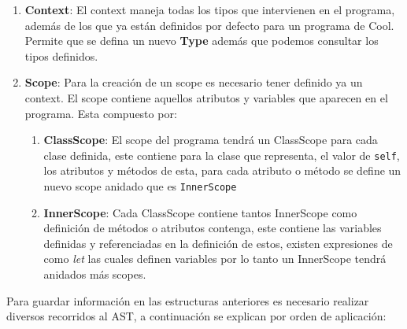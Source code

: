 \documentclass{article}
\begin{document}
\begin{enumerate}
	\item [] \textbf{Context}: El context maneja todas los tipos que intervienen en el programa, adem\'as de los que ya est\'an definidos por defecto para un programa de Cool. Permite que se defina un nuevo \textbf{Type} adem\'as que podemos consultar los tipos definidos.
	
	\item[] \textbf{Scope}: Para la creaci\'on de un scope es necesario tener definido ya un context. El scope contiene aquellos atributos y variables que aparecen en el programa. Esta compuesto por:
		\begin{enumerate}
			\item[] \textbf{ClassScope}: El scope del programa tendr\'a un ClassScope para cada clase definida, este contiene para la clase que representa, el valor de \verb|self|, los atributos y m\'etodos de esta, para cada atributo o m\'etodo se define un nuevo scope anidado que es \verb|InnerScope|\\
		
			\item[] \textbf{InnerScope}: Cada ClassScope contiene tantos InnerScope como definici\'on de m\'etodos o atributos contenga, este contiene las variables definidas y referenciadas en la definici\'on de estos, existen expresiones de como \textit{let} las cuales definen variables por lo tanto un InnerScope tendr\'a anidados m\'as scopes. 
		\end{enumerate}
\end{enumerate}

Para guardar informaci\'on en las estructuras anteriores es necesario realizar diversos recorridos al AST, a continuaci\'on se explican por orden de aplicaci\'on:
\end{document}
